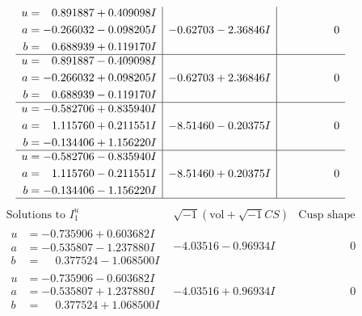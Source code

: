 \documentclass[1p]{elsarticle_modified}
\theoremstyle{definition}
\newcommand{\I}{\sqrt{-1}}
\begin{document}
$$\begin{array}{c|c|c}
\begin{aligned}
u &= \phantom{-}0.891887 + 0.409098 I \\
a &= -0.266032 - 0.098205 I \\
b &= \phantom{-}0.688939 + 0.119170 I\end{aligned}
 & -0.62703 - 2.36846 I & \phantom{-0.000000 } 0 \\ \hline\begin{aligned}
u &= \phantom{-}0.891887 - 0.409098 I \\
a &= -0.266032 + 0.098205 I \\
b &= \phantom{-}0.688939 - 0.119170 I\end{aligned}
 & -0.62703 + 2.36846 I & \phantom{-0.000000 } 0 \\ \hline\begin{aligned}
u &= -0.582706 + 0.835940 I \\
a &= \phantom{-}1.115760 + 0.211551 I \\
b &= -0.134406 + 1.156220 I\end{aligned}
 & -8.51460 - 0.20375 I & \phantom{-0.000000 } 0 \\ \hline\begin{aligned}
u &= -0.582706 - 0.835940 I \\
a &= \phantom{-}1.115760 - 0.211551 I \\
b &= -0.134406 - 1.156220 I\end{aligned}
 & -8.51460 + 0.20375 I & \phantom{-0.000000 } 0\\
 \hline 
 \end{array}$$\newpage$$\begin{array}{c|c|c}  
\text{Solutions to }I^u_{1}& \I (\text{vol} + \sqrt{-1}CS) & \text{Cusp shape}\\
 \hline 
\begin{aligned}
u &= -0.735906 + 0.603682 I \\
a &= -0.535807 - 1.237880 I \\
b &= \phantom{-}0.377524 - 1.068500 I\end{aligned}
 & -4.03516 - 0.96934 I & \phantom{-0.000000 } 0 \\ \hline\begin{aligned}
u &= -0.735906 - 0.603682 I \\
a &= -0.535807 + 1.237880 I \\
b &= \phantom{-}0.377524 + 1.068500 I\end{aligned}
 & -4.03516 + 0.96934 I & \phantom{-0.000000 } 0 \\ \hline\begin{aligned}

\end{aligned}
\end{array}$$
\end{document}
